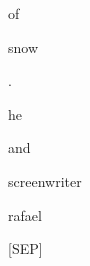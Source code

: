 \documentclass[varwidth=150mm]{standalone}
\begin{document}
\begin{CJK*}{UTF8}{gbsn}
{{{\colorbox{red!0.0}{\strut of} \colorbox{red!50.06137466430664}{\strut snow} \colorbox{red!0.0}{\strut .} \colorbox{red!5.7799811363220215}{\strut he} \colorbox{red!1.793784499168396}{\strut and} \colorbox{red!5.210630893707275}{\strut screenwriter} \colorbox{red!35.15220642089844}{\strut rafael} \colorbox{red!1.2522964477539062}{\strut [SEP]}
}}}
\end{CJK*}
\end{document}

